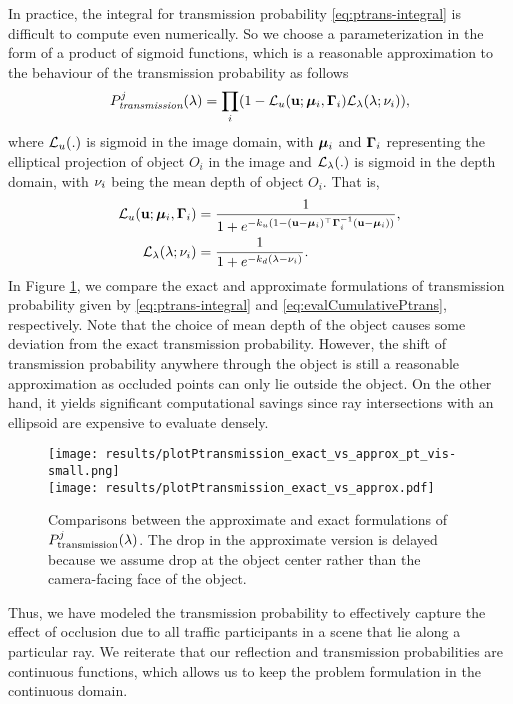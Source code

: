 In practice, the integral for transmission probability \eqref{eq:ptrans-integral} is difficult to compute even numerically. So we choose a parameterization in the form of a product of sigmoid functions, which is a reasonable approximation to the behaviour of the transmission probability as follows
%
\newcommand{\Ptransmission}{P_{\textit{transmission}}}%
\begin{align}
  \Ptransmission^j(\lambda) = \prod_i (1 - \cL_u (\bu; \bmu_i, \bGamma_i) \cL_{\lambda}(\lambda; \meandepth{i})),
\label{eq:evalCumulativePtrans}
\end{align}
%
where $\mathcal{L}_u(.)$ is sigmoid in the image domain, with ${\bm{\mu}}_i$ and $\bm{\Gamma}_i$ representing the elliptical projection of object $O_i$ in the image and $\mathcal{L}_{\lambda}(.)$ is sigmoid in the depth domain, with $\nu_i$ being the mean depth of object $O_i$. That is,
%
\begin{align}
\mathcal{L}_u(\mathbf{u}; {\bm{\mu}}_i, \bm{\Gamma}_i) &= \frac{1}{1 + e^{-k_u(1 - (\mathbf{u} - {\bm{\mu}}_i)^\top \bm{\Gamma}_i^{-1} (\mathbf{u} - {\bm{\mu}}_i))}}, \\
  \mathcal{L}_{\lambda}(\lambda; \nu_i) &= \frac{1}{1 + e^{-k_d(\lambda - \nu_i)}}.
\end{align}
%
In Figure \ref{fig:compare:exact:approx:ptrans}, we compare the exact and approximate formulations of transmission probability given by \eqref{eq:ptrans-integral} and \eqref{eq:evalCumulativePtrans}, respectively. Note that the choice of mean depth of the object causes some deviation from the exact transmission probability. However, the shift of transmission probability anywhere through the object is still a reasonable approximation as occluded points can only lie outside the object. On the other hand, it yields significant computational savings since ray intersections with an ellipsoid are expensive to evaluate densely.


\begin{figure}
\centering
  \texttt{[image: results/plotPtransmission\_exact\_vs\_approx\_pt\_vis-small.png]}\\
  \texttt{[image: results/plotPtransmission\_exact\_vs\_approx.pdf]}
  \vspace{-0.3cm}
  \caption{\small Comparisons between the approximate and exact formulations of $P^{j}_{\text{transmission}}(\lambda)$. The drop in the approximate version is delayed because we assume drop at the object center rather than the camera-facing face of the object.}
  \label{fig:compare:exact:approx:ptrans}
  \vspace{-0.3cm}
\end{figure}

Thus, we have modeled the transmission probability to effectively capture the effect of occlusion due to all traffic participants in a scene that lie along a particular ray. We reiterate that our reflection and transmission probabilities are continuous functions, which allows us to keep the problem formulation in the continuous domain.
